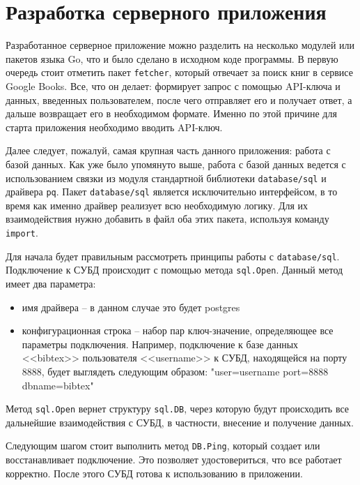 \section*{Разработка серверного приложения}

Разработанное серверное приложение можно разделить на несколько модулей или пакетов языка Go, что и было сделано
в исходном коде программы. В первую очередь стоит отметить пакет \texttt{fetcher}, который отвечает за
поиск книг в сервисе Google Books. Все, что он делает: формирует запрос с помощью API-ключа и данных,
введенных пользователем, после чего отправляет его и получает ответ, а дальше возвращает его в необходимом
формате. Именно по этой причине для старта приложения необходимо вводить API-ключ.

Далее следует, пожалуй, самая крупная часть данного приложения: работа с базой данных. Как уже было упомянуто
выше, работа с базой данных ведется с использованием связки из модуля стандартной библиотеки \texttt{database/sql} и
драйвера \texttt{pq}. Пакет \texttt{database/sql} является исключительно интерфейсом, в то время как именно
драйвер реализует всю необходимую логику. Для их взаимодействия нужно добавить в файл оба этих пакета, используя команду
\texttt{import}.

Для начала будет правильным рассмотреть принципы работы с \texttt{database/sql}.
Подключение к СУБД происходит с помощью метода \texttt{sql.Open}.
Данный метод имеет два параметра:

\begin{itemize}
    \item имя драйвера -- в данном случае это будет postgres
    \item конфигурационная строка -- набор пар ключ-значение, определяющее все параметры подключения. Например,
    подключение к базе данных <<bibtex>> пользователя <<username>> к СУБД, находящейся на порту 8888, будет выглядеть
    следующим образом: "user=username port=8888 dbname=bibtex"
\end{itemize}

Метод \texttt{sql.Open} вернет структуру \texttt{sql.DB}, через которую будут происходить
все дальнейшие взаимодействия с СУБД, в частности, внесение и получение данных.

Следующим шагом стоит выполнить метод \texttt{DB.Ping}, который создает или восстанавливает подключение.
Это позволяет удостовериться, что все работает корректно. После этого СУБД готова к использованию в приложении.

